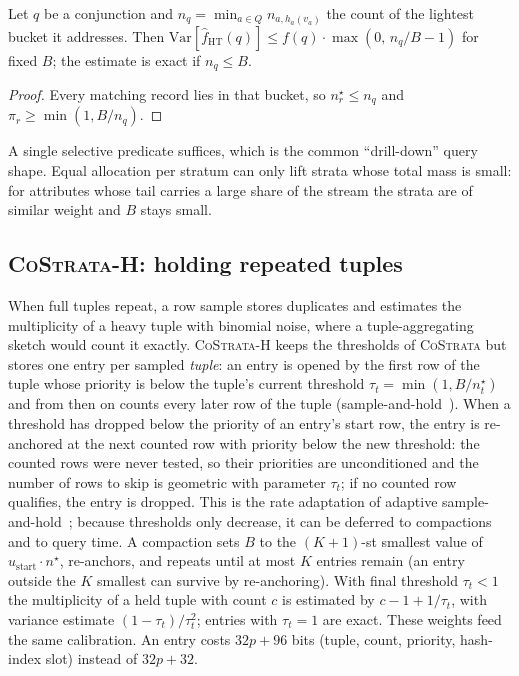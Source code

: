 \documentclass[sigconf]{acmart}
\newcommand{\cs}{\textsc{CoStrata}\xspace}
\newcommand{\csh}{\textsc{CoStrata-H}\xspace}
\newcommand{\Var}{\mathrm{Var}}
\newcommand{\nstar}{n^{\star}}
\begin{document}
\begin{proposition}\label{prop:rare}
Let $q$ be a conjunction and $n_q=\min_{a\in Q}n_{a,h_a(v_a)}$ the count of the lightest bucket it
addresses. Then $\Var[\hat f_{\mathrm{HT}}(q)]\le f(q)\cdot\max(0,\,n_q/B-1)$ for fixed $B$; the
estimate is exact if $n_q\le B$.
\end{proposition}
\begin{proof}
Every matching record lies in that bucket, so $\nstar_r\le n_q$ and $\pi_r\ge\min(1,B/n_q)$.
\end{proof}
A single selective predicate suffices, which is the common ``drill-down'' query shape. Equal allocation
per stratum can only lift strata whose total mass is small: for attributes whose tail carries a large share
of the stream the strata are of similar weight and $B$ stays small.

\subsection{\csh: holding repeated tuples}\label{sec:hold}

When full tuples repeat, a row sample stores duplicates and estimates the multiplicity of a heavy tuple
with binomial noise, where a tuple-aggregating sketch would count it exactly. \csh keeps the thresholds of
\cs but stores one entry per sampled \emph{tuple}: an entry is opened by the first row of the tuple whose
priority is below the tuple's current threshold $\tau_t=\min(1,B/\nstar_t)$ and from then on counts every
later row of the tuple (sample-and-hold~\cite{sah,cm-counting}). When a threshold has dropped below the
priority of an entry's start row, the entry is re-anchored at the next counted row with priority below the
new threshold: the counted rows were never tested, so their priorities are unconditioned and the number
of rows to skip is geometric with parameter $\tau_t$; if no counted row qualifies, the entry is dropped. This
is the rate adaptation of adaptive sample-and-hold~\cite{ash-insert}; because thresholds only decrease, it
can be deferred to compactions and to query time. A compaction sets $B$ to the $(K{+}1)$-st smallest
value of $u_{\text{start}}\cdot\nstar$, re-anchors, and repeats until at most $K$ entries remain (an
entry outside the $K$ smallest can survive by re-anchoring). With final threshold $\tau_t<1$ the
multiplicity of a held tuple with count $c$ is estimated by $c-1+1/\tau_t$, with variance estimate
$(1-\tau_t)/\tau_t^2$; entries with $\tau_t=1$ are exact. These weights feed the same calibration. An
entry costs $32p+96$ bits (tuple, count, priority, hash-index slot) instead of $32p+32$.
\end{document}
